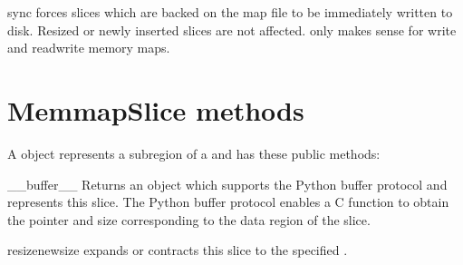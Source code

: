 \begin{methoddesc}[Memmap]{sync}{}
   forces slices which are backed on the map file to be
  immediately written to disk.  Resized or newly inserted slices are
  not affected.   only makes sense for write and
  readwrite memory maps.
\end{methoddesc}

\section{MemmapSlice methods}
\label{sec:memmap-methods}
A  object represents a subregion of a
 and has these public methods:

\begin{methoddesc}[MemmapSlice]{__buffer__}{}
  Returns an object which supports the Python buffer protocol and
  represents this slice.  The Python buffer protocol enables a C
  function to obtain the pointer and size corresponding to the data
  region of the slice.
\end{methoddesc}

\begin{methoddesc}[MemmapSlice]{resize}{newsize}
   expands or contracts this slice to the specified
  .
\end{methoddesc}

